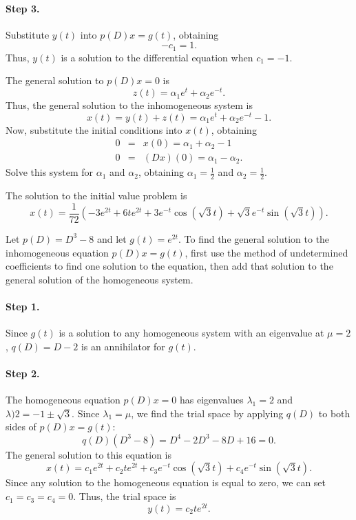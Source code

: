 \documentclass{ximera}
\begin{document}
\paragraph{Step 3.} Substitute $y(t)$ into $p(D)x = g(t)$, obtaining
\[
-c_1 = 1.
\]
Thus, $y(t)$ is a solution to the differential equation when $c_1 = -1$.

\para The general solution to $p(D)x = 0$ is
\[
z(t) = \alpha_1e^t + \alpha_2e^{-t}.
\]
Thus, the general solution to the inhomogeneous system is
\[
x(t) = y(t) + z(t) = \alpha_1e^t + \alpha_2e^{-t} - 1.
\]
Now, substitute the initial conditions into $x(t)$, obtaining
\[
\begin{array}{rcl}
0 & = & x(0) = \alpha_1 + \alpha_2 - 1 \\
0 & = & (Dx)(0) = \alpha_1 - \alpha_2.
\end{array}
\]
Solve this system for $\alpha_1$ and $\alpha_2$, obtaining
$\alpha_1 = \frac{1}{2}$ and $\alpha_2 = \frac{1}{2}$.

 \ans The solution to the initial value problem is
\[
x(t) = \frac{1}{72}(-3e^{2t} + 6te^{2t} + 3e^{-t}\cos(\sqrt{3}t)
+ \sqrt{3}e^{-t}\sin(\sqrt{3}t)).
\]

\soln Let $p(D) = D^3 - 8$ and let $g(t) = e^{2t}$.  To find the general
solution to the inhomogeneous equation $p(D)x = g(t)$, first use the
method of undetermined coefficients to find one solution to the
equation, then add that solution to the general solution of the
homogeneous system.

\paragraph{Step 1.} Since $g(t)$ is a solution to any homogeneous
system with an eigenvalue at $\mu = 2$, $q(D) = D - 2$ is an annihilator
for $g(t)$.

\paragraph{Step 2.} The homogeneous equation $p(D)x = 0$ has eigenvalues
$\lambda_1 = 2$ and $\lambda)2 = -1 \pm \sqrt{3}$.  Since $\lambda_1 =
\mu$, we find the trial space by applying $q(D)$ to both sides of
$p(D)x = g(t)$:
\[
q(D)(D^3 - 8) = D^4 - 2D^3 - 8D + 16 = 0.
\]
The general solution to this equation is
\[
x(t) = c_1e^{2t} + c_2te^{2t} + c_3e^{-t}\cos(\sqrt{3}t)
+ c_4e^{-t}\sin(\sqrt{3}t).
\]
Since any solution to the homogeneous equation is equal to zero, we can
set $c_1 = c_3 = c_4 = 0$.  Thus, the trial space is
\[
y(t) = c_2te^{2t}.
\]
\end{document}
